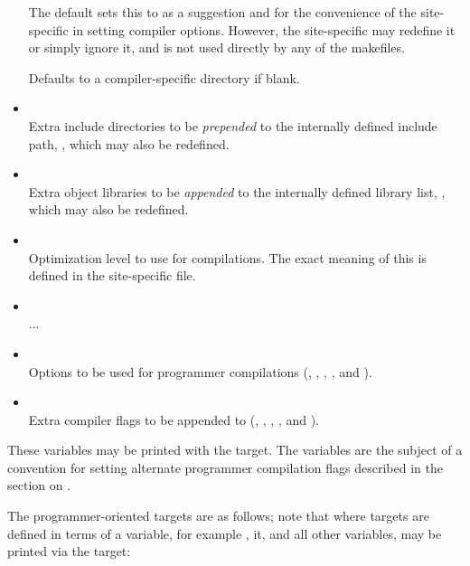 \begin{itemize}
   The default  sets this to  as a
   suggestion and for the convenience of the site-specific  in
   setting compiler options.  However, the site-specific  may
   redefine it or simply ignore it, and  is not used directly
   by any of the makefiles.

   Defaults to a compiler-specific directory if blank.

\item
   \\ Extra include directories to be {\em prepended} to the internally
   defined include path, , which may also be redefined.

\item
   \\ Extra object libraries to be {\em appended} to the internally
   defined library list, , which may also be redefined.

\item
   \\ Optimization level to use for compilations.  The exact meaning of this
   is defined in the site-specific  file.

\item
   \\ ...

\item
   \\ Options to be used for programmer compilations (,
   , , ,  and
   ).

\item
   \\ Extra compiler flags to be appended to  (,
   , , ,  and
   ).
\end{itemize}

\noindent
These variables may be printed with the  target.  The
 variables are the subject of a convention for setting alternate
programmer compilation flags described in the section on .

The programmer-oriented targets are as follows; note that where targets are
defined in terms of a  variable, for example ,
it, and all other variables, may be printed via the  target:

